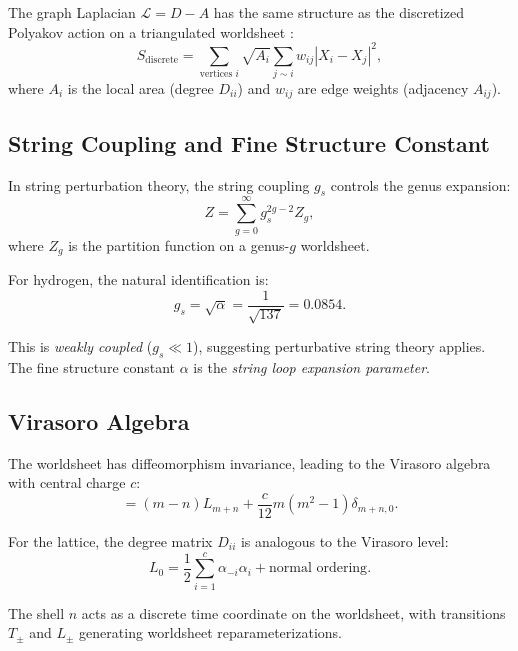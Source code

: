 \documentclass[aps,prd,twocolumn,superscriptaddress,floatfix]{revtex4-2}
\begin{document}
The graph Laplacian $\mathcal{L} = D - A$ has the same structure as the discretized Polyakov action on a triangulated worldsheet \cite{david1985,kazakov1985}:
\begin{equation}
S_{\text{discrete}} = \sum_{\text{vertices } i} \sqrt{A_i} \sum_{j \sim i} w_{ij} |X_i - X_j|^2,
\end{equation}
where $A_i$ is the local area (degree $D_{ii}$) and $w_{ij}$ are edge weights (adjacency $A_{ij}$).

\subsection{String Coupling and Fine Structure Constant}

In string perturbation theory, the string coupling $g_s$ controls the genus expansion:
\begin{equation}
Z = \sum_{g=0}^\infty g_s^{2g-2} Z_g,
\end{equation}
where $Z_g$ is the partition function on a genus-$g$ worldsheet.

For hydrogen, the natural identification is:
\begin{equation}
g_s = \sqrt{\alpha} = \frac{1}{\sqrt{137}} = 0.0854.
\end{equation}

This is \textit{weakly coupled} ($g_s \ll 1$), suggesting perturbative string theory applies. The fine structure constant $\alpha$ is the \textit{string loop expansion parameter}.

\subsection{Virasoro Algebra}

The worldsheet has diffeomorphism invariance, leading to the Virasoro algebra with central charge $c$:
\begin{equation}
[L_m, L_n] = (m-n)L_{m+n} + \frac{c}{12}m(m^2-1)\delta_{m+n,0}.
\end{equation}

For the lattice, the degree matrix $D_{ii}$ is analogous to the Virasoro level:
\begin{equation}
L_0 = \frac{1}{2}\sum_{i=1}^c \alpha_{-i} \alpha_i + \text{normal ordering}.
\end{equation}

The shell $n$ acts as a discrete time coordinate on the worldsheet, with transitions $T_\pm$ and $L_\pm$ generating worldsheet reparameterizations.
\end{document}
